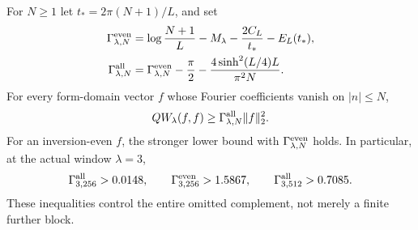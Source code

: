 \begin{proposition}
\label{prop:v115-sharp-tail}
For $N\ge1$ let $t_*=2\pi(N+1)/L$, and set
\begin{align}
 \Gamma_{\lambda,N}^{\rm even}
   &=\log\frac{N+1}{L}-M_\lambda
                -\frac{2C_L}{t_*}-E_L(t_*),\notag\\
 \Gamma_{\lambda,N}^{\rm all}
   &=\Gamma_{\lambda,N}^{\rm even}-\frac\pi2
                   -\frac{4\sinh^2(L/4)L}{\pi^2N}.
 \label{eq:v115-sharp-tail}
\end{align}
For every form-domain vector $f$ whose Fourier coefficients vanish on
$|n|\le N$,
\[
 QW_\lambda(f,f)\ge\Gamma_{\lambda,N}^{\rm all}\|f\|_2^2.
\]
For an inversion-even $f$, the stronger lower bound with
$\Gamma_{\lambda,N}^{\rm even}$ holds. In particular, at the actual
window $\lambda=3$,
\begin{equation}\label{eq:v115-lambda3-tail}
 \Gamma_{3,256}^{\rm all}>0.0148,\qquad
 \Gamma_{3,256}^{\rm even}>1.5867,\qquad
 \Gamma_{3,512}^{\rm all}>0.7085.
\end{equation}
These inequalities control the entire omitted complement, not merely a
finite further block.
\end{proposition}
